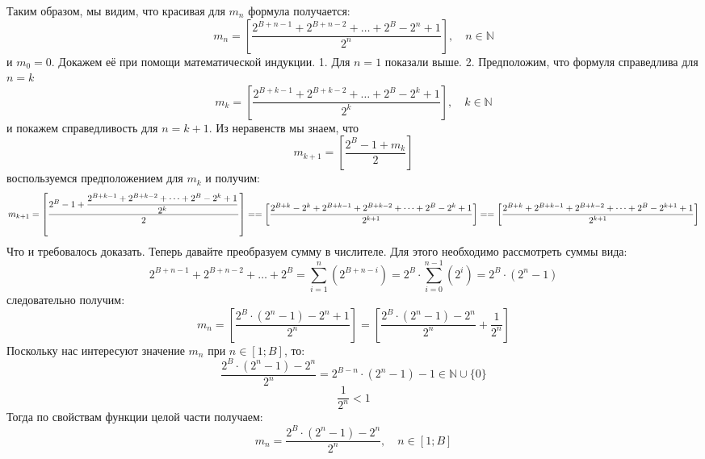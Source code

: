 Таким образом, мы видим, что красивая для $m_n$ формула получается:
\begin{dmath*}
m_n =  \left[\dfrac{2^{B+n-1} + 2^{B+n-2}+ \dots + 2^B - 2^n + 1}{2^n} \right],\quad n\in \mathbb{N}
\end{dmath*}
и \(m_0 = 0\).
Докажем её при помощи математической индукции. 
1. Для \(n=1\) показали выше.
2. Предположим, что формуля справедлива для \(n=k\)
\begin{dmath*}
m_k =  \left[\dfrac{2^{B+k-1} + 2^{B+k-2}+ \dots + 2^B - 2^k + 1}{2^k} \right],\quad k\in \mathbb{N}
\end{dmath*}
и покажем справедливость для \(n=k+1\). Из неравенств мы знаем, что 
\begin{dmath*}
m_{k+1} = \left[\dfrac{2^B -1 + m_k}{2} \right]
\end{dmath*}
воспользуемся предположением для \(m_k\) и получим:
\begin{dmath*}
m_{k+1} = \left[\dfrac{2^B -1 + \dfrac{2^{B+k-1} + 2^{B+k-2}+ \dots + 2^B - 2^k + 1}{2^k}}{2} \right]
= \\[10pt] =
 \left[\dfrac{2^{B+k} - 2^k + 2^{B+k-1} + 2^{B+k-2}+ \dots + 2^B - 2^k + 1 }{2^{k+1}}\right]
 = \\[10pt] =
  \left[\dfrac{2^{B+k}  + 2^{B+k-1} + 2^{B+k-2}+ \dots + 2^B - 2^{k+1} + 1 }{2^{k+1}}\right]
\end{dmath*}
Что и требовалось доказать. Теперь давайте преобразуем сумму в числителе. Для этого необходимо рассмотреть суммы вида:
\begin{dmath*}
2^{B+n-1} + 2^{B+n-2}+ \dots + 2^B = \sum_{i = 1}^{n}\left(2^{B+n-i}\right) = 2^B \cdot \sum_{i = 0}^{n-1}\left(2^{i}\right)
=
2^B \cdot (2^n - 1)
\end{dmath*} 
следовательно получим:
\begin{dmath*}
m_n = \left[\dfrac{2^B \cdot (2^n - 1) - 2^n +1}{2^n} \right]
=\left[\dfrac{2^B \cdot (2^n - 1) - 2^n}{2^n} + \dfrac{1}{2^n} \right]
\end{dmath*}
Поскольку нас интересуют значение \(m_n\) при \(n \in [1;B]\), то:
\begin{dmath*}
\dfrac{2^B \cdot (2^n - 1) - 2^n}{2^n} = 2^{B-n}\cdot (2^n - 1) - 1  \in \mathbb{N}\cup\{0\}
\end{dmath*}
\begin{dmath*}
    \dfrac{1}{2^n} < 1
\end{dmath*}
Тогда по свойствам функции целой части получаем:
\begin{dmath*}
    m_n = \dfrac{2^B \cdot (2^n - 1) - 2^n}{2^n}, \quad n \in [1; B]
\end{dmath*}
